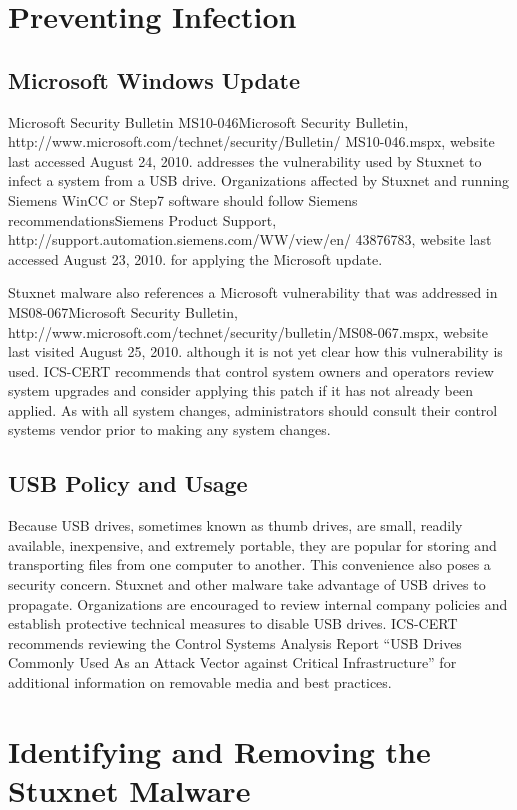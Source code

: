 \documentclass[10pt,twoside,openleft]{memoir}
\begin{document}
\section{Preventing Infection}

\subsection{Microsoft Windows Update}

Microsoft Security Bulletin MS10-046Microsoft Security Bulletin, http://www.microsoft.com/technet/security/Bulletin/ MS10-046.mspx, website last accessed August 24, 2010. addresses the vulnerability used by Stuxnet to infect a system from a USB drive. Organizations affected by Stuxnet and running Siemens WinCC or Step7 software should follow Siemens recommendationsSiemens Product Support, http://support.automation.siemens.com/WW/view/en/ 43876783, website last accessed August 23, 2010. for applying the Microsoft update.

Stuxnet malware also references a Microsoft vulnerability that was addressed in MS08-067Microsoft Security Bulletin, http://www.microsoft.com/technet/security/bulletin/MS08-067.mspx, website last visited August 25, 2010. although it is not yet clear how this vulnerability is used. ICS-CERT recommends that control system owners and operators review system upgrades and consider applying this patch if it has not already been applied. As with all system changes, administrators should consult their control systems vendor prior to making any system changes.

\subsection{USB Policy and Usage}

Because USB drives, sometimes known as thumb drives, are small, readily available, inexpensive, and extremely portable, they are popular for storing and transporting files from one computer to another. This convenience also poses a security concern. Stuxnet and other malware take advantage of USB drives to propagate. Organizations are encouraged to review internal company policies and establish protective technical measures to disable USB drives. ICS-CERT recommends reviewing the Control Systems Analysis Report ``USB Drives Commonly Used As an Attack Vector against Critical Infrastructure''  for additional information on removable media and best practices.

\section{Identifying and Removing the Stuxnet Malware}
\end{document}
